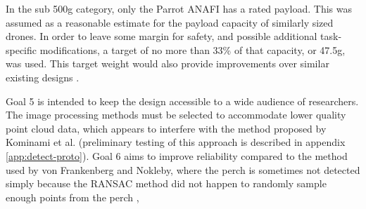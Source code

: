 In the sub 500g category, only the Parrot ANAFI has a rated payload. This was assumed as a reasonable estimate for the
payload capacity of similarly sized drones. In order to leave some margin for safety, and possible additional task-specific
modifications, a target of no more than 33\% of that capacity, or 47.5g, was used. This target weight would also 
provide improvements over similar existing designs \cite{chi_optimized_2014,nguyen_passively_2019}.

Goal 5 is intended to keep the design accessible to a wide audience of researchers. The image processing methods 
must be selected to accommodate lower quality point cloud data, which appears to interfere with the method 
proposed by Kominami et al. \cite{kominami_detection_2023} (preliminary testing of this approach is described in 
appendix \ref{app:detect-proto}). Goal 6 aims to improve reliability compared to the method used by von Frankenberg and 
Nokleby, where the perch is sometimes not detected simply because the RANSAC method 
did not happen to randomly sample enough points from the perch \cite{von_frankenberg_detection_2020}, \cite{von_frankenberg_detection_2020}